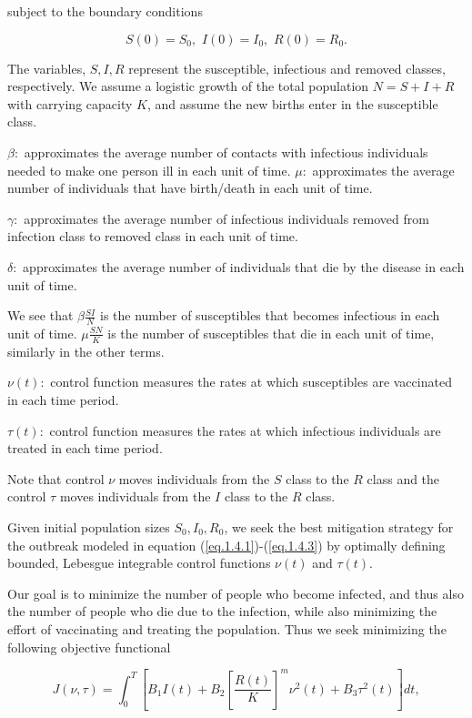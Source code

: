 subject to the boundary conditions

\begin{equation}\label{eq.1.4.4}
S(0)=S_0,\,\, I(0)=I_0,\,\, R(0)=R_0.
\end{equation}

The variables,  $S,I, R$ represent the susceptible, infectious and removed classes, respectively. We assume a logistic growth of the total population $N=S+I+R$ with carrying capacity $K$, and assume the new births enter in the susceptible class.

$\beta :$ approximates the average number of contacts with infectious individuals needed to make one person ill in each unit of time.
$\mu :$ approximates the average number of individuals that have birth/death in each unit of time.

$\gamma :$ approximates the average number of infectious individuals removed from infection class to removed class in each unit of time.

$\delta :$ approximates the average number of individuals that die by the disease in each unit of time.

We see that $\beta \frac{SI}{N}$ is the number of susceptibles that becomes infectious in each unit of time. $\mu \frac{SN}{K}$ is the number of susceptibles that die in each unit of time, similarly in the other terms. 

$\nu (t):$ control function measures the rates at which susceptibles are vaccinated in each time period.

$\tau (t):$ control function measures the rates at which infectious individuals are treated in each time period.

Note that control $\nu$ moves individuals from the $S$ class to the $R$ class and the control $\tau$ moves individuals from the $I$ class to the $R$ class.

Given initial population sizes $S_0,I_0,R_0$, we seek the best mitigation strategy for the outbreak modeled in equation (\ref{eq.1.4.1})-(\ref{eq.1.4.3}) by optimally defining bounded, Lebesgue integrable control functions $\nu (t)$ and $\tau (t)$.

Our goal is to minimize the number of people who become infected, and thus also the number of people who die due to the infection, while also minimizing the effort of vaccinating and treating the population. Thus we seek minimizing the following objective functional

\begin{equation}\label{eq.1.4.5}
J(\nu,\tau)=\int_{0}^{T} \left[B_1 I(t)+B_2\left[\frac{R(t)}{K}\right]^m \nu^2(t)+B_3\tau^2(t)\right] dt,
\end{equation}

